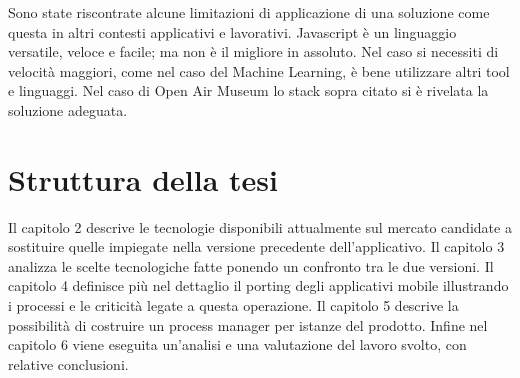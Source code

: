 Sono state riscontrate alcune limitazioni di applicazione di una soluzione come questa in altri contesti applicativi e lavorativi. Javascript è un linguaggio versatile, veloce e facile; ma non è il migliore in assoluto. Nel caso si necessiti di velocità maggiori, come nel caso del Machine Learning, è bene utilizzare altri tool e linguaggi. Nel caso di Open Air Museum lo stack sopra citato si è rivelata la soluzione adeguata. 
	
\section{Struttura della tesi}\vspace{5mm}
	
Il capitolo 2 descrive le tecnologie disponibili attualmente sul mercato candidate a sostituire quelle impiegate nella versione precedente dell’applicativo. Il capitolo 3 analizza le scelte tecnologiche fatte ponendo un confronto tra le due versioni. Il capitolo 4 definisce più nel dettaglio il porting degli applicativi mobile illustrando i processi e le criticità legate a questa operazione. Il capitolo 5 descrive la possibilità di costruire un process manager per istanze del prodotto. Infine nel capitolo 6 viene eseguita un’analisi e una valutazione del lavoro svolto, con relative conclusioni. 


